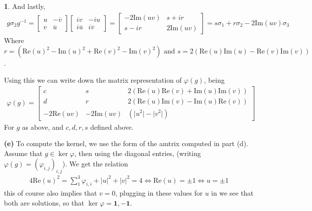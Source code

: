 \documentclass[10.5pt]{article}
\theoremstyle{definition}
\newtheorem{pb}{}
\newcommand{\abs}[1]{\lvert#1\rvert}
\newcommand{\tand}{\text{ and }}
\begin{document}
\begin{pb}
        And lastly,
        \begin{align*}
            g \sigma_2 g^{-1} = \begin{bmatrix} u & -\overline{v} \\ v & \overline{u} \end{bmatrix}\begin{bmatrix} iv & -iu \\ i \overline{u} & i \overline{v} \end{bmatrix}
            = \begin{bmatrix} -2\text{Im}(uv) & s+ir \\ s-ir &  2 \text{Im}(uv) \end{bmatrix} = s\sigma_1 + r\sigma_2 - 2\text{Im}(uv) \sigma_3
        \end{align*}
        Where \(r = (\text{Re}(u)^2 - \text{Im}(u)^2 + \text{Re}(v)^2 - \text{Im}(v)^2) \tand s = 2(\text{Re}(u)\text{Im}(u) - \text{Re}(v)\text{Im}(v))\).

        Using this we can write down the matrix representation of \(\varphi(g)\), being
        \begin{align*}
            \varphi(g) = \begin{bmatrix} 
                c & s & 2(\text{Re}(u)\text{Re}(v) + \text{Im}(u)\text{Im}(v)) \\ 
                d & r & 2(\text{Re}(u)\text{Im}(v) - \text{Im}(u)\text{Re}(v)) \\ 
                -2\text{Re}(uv) & -2\text{Im}(uv) & (\abs{u^2} - \abs{v^2}) 
            \end{bmatrix}
        \end{align*}
        For \(g\) as above, and \(c,d,r,s\) defined above.

        \textbf{(e)} To compute the kernel, we use the form of the amtrix computed in part (d). Assume that \(g \in \ker \varphi\), 
        then using the diagonal entries, (writing \(\varphi(g) = (\varphi_{i,j})_{i,j}\)). We get the relation
        \begin{align*}
            4\text{Re}(u)^2 = \sum_1^3 \varphi_{i,i} + \abs{u}^2 + \abs{v}^2 = 4 \iff \text{Re}(u) = \pm 1 \iff u = \pm 1
        \end{align*}
        this of course also implies that \(v = 0\), plugging in these values for \(u\) in we see that both are solutions, so that 
        \(\ker \varphi = \mathbf{1}, - \mathbf{1}\).


\end{pb}
\end{document}
